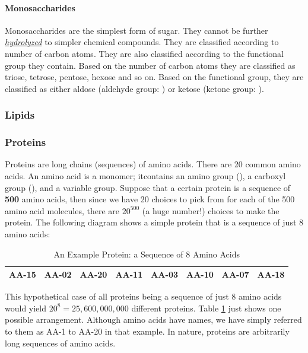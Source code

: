 \paragraph{Monosaccharides}
Monosaccharides are the simplest form of sugar. They cannot be further \hyperref[sec: hydrolysis]{\emph{hydrolyzed}} to simpler chemical compounds. They are classified according to number of carbon atoms. They are also classified according to the functional group they contain. Based on the number of carbon atoms they are classified as triose, tetrose, pentose, hexose and so on. Based on the functional group, they are classified as either aldose (aldehyde group: ) or ketose (ketone group: ).
\subsubsection{Lipids}
\subsubsection{Proteins}
Proteins are long chains (sequences) of amino acids. There are 20 common amino acids. An amino acid is a monomer; itcontains an amino group (), a carboxyl group (), and a variable group. Suppose that a certain protein is a sequence of \textbf{500} amino acids, then since we have 20 choices to pick from for each of the 500 amino acid molecules, there are $20^{500}$ (a huge number!) choices to make the protein. The following diagram shows a simple protein that is a sequence of just 8 amino acids: 
\begin{table}[htbp!]
  \begin{center}
    \caption{An Example Protein: a Sequence of 8 Amino Acids}
    \label{tab: simple protein}
    \begin{tabular}{|c|c|c|c|c|c|c|c|} 
      \hline
        AA-15 &
        AA-02 &
        AA-20 &
        AA-11 &
        AA-03 &
        AA-10 &
        AA-07 &
        AA-18 \\
        \hline
    \end{tabular}
  \end{center}
\end{table}
This hypothetical case of all proteins being a sequence of just 8 amino acids would yield 
$20^8=25,600,000,000$ different proteins. Table \ref{tab: simple protein} just shows one possible arrangement. Although amino acids have names, we have simply referred to them as AA-1 to AA-20 in that example. In nature, proteins are arbitrarily long sequences of amino acids.

